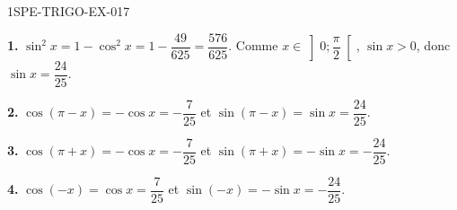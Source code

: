 \begin{corrige}{1SPE-TRIGO-EX-017}

\textbf{1.} $\sin^2 x = 1 - \cos^2 x = 1 - \dfrac{49}{625} = \dfrac{576}{625}$. Comme $x \in \left]0;\dfrac{\pi}{2}\right[$, $\sin x > 0$, donc $\sin x = \dfrac{24}{25}$.

\textbf{2.} $\cos(\pi - x) = -\cos x = -\dfrac{7}{25}$ et $\sin(\pi - x) = \sin x = \dfrac{24}{25}$.

\textbf{3.} $\cos(\pi + x) = -\cos x = -\dfrac{7}{25}$ et $\sin(\pi + x) = -\sin x = -\dfrac{24}{25}$.

\textbf{4.} $\cos(-x) = \cos x = \dfrac{7}{25}$ et $\sin(-x) = -\sin x = -\dfrac{24}{25}$.

\end{corrige}
